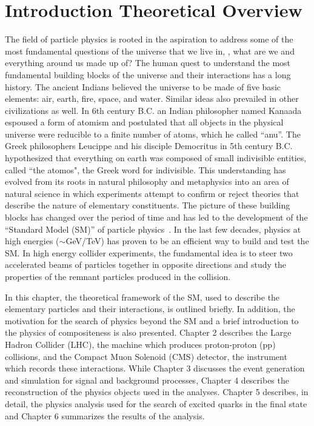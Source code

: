 \chapter{Introduction \nd Theoretical Overview}

The field of particle physics is rooted in the aspiration to address some of the most fundamental questions of the universe that we live in, \ie, 
what are we and everything around us made up of? The human quest to understand the most fundamental building blocks of the universe and their 
interactions has a long history. The ancient Indians believed the universe to be made of five basic elements: air, earth, fire, space, and water. 
Similar ideas also prevailed in other civilizations as well. In 6th century B.C. an Indian philosopher named Kanaada espoused a form of atomism and 
postulated that all objects in the physical universe were reducible to a finite number of atoms, which he called ``anu''. The Greek philosophers 
Leucippe and his disciple Democritus in 5th century B.C. hypothesized that everything on earth was composed of small indivisible entities, called 
``the atomos", the Greek word for indivisible. This understanding has evolved from its roots in natural philosophy and metaphysics into an area of 
natural science in which experiments attempt to confirm or reject theories that describe the nature of elementary constituents. The picture of these 
building blocks has changed over the period of time and has led to the development of the ``Standard Model (\gls{SM})'' of particle physics~\cite{Glashow:1961tr, Salam:1964ry, Weinberg:1967tq}. In the last few decades, physics at high energies ($\sim$GeV/TeV) has proven to be an efficient way 
to build and test the SM. In high energy collider experiments, the fundamental idea is to steer two accelerated beams of particles together in opposite 
directions and study the properties of the remnant particles produced in the collision.

In this chapter, the theoretical framework of the SM, used to describe the elementary particles and their interactions, is outlined 
briefly. In addition, the motivation for the search of physics beyond the SM and a brief introduction to the physics of compositeness is also
presented.  Chapter 2 describes the Large Hadron Collider (\gls{LHC}), the machine which produces proton-proton (pp) collisions, and the Compact Muon
Solenoid (\gls{CMS}) detector, the instrument which records these interactions. While Chapter 3 discusses the event generation and simulation for 
signal and background processes, Chapter 4 describes the reconstruction of the physics objects used in the analyses. Chapter 5 describes, in detail, 
the physics analysis used for the search of excited quarks in the \gamjet final state and Chapter 6 summarizes the results of the analysis.

